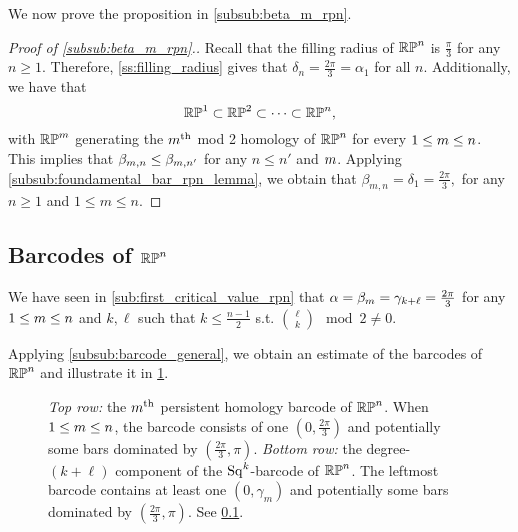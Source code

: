 \subsubsection{}
We now prove the proposition in \cref{subsub:beta_m_rpn}.

\begin{proof}[Proof of \cref{subsub:beta_m_rpn}.]
	Recall that the filling radius of $\mathbb{RP}^n$ is $\frac{\pi}{3}$ for any $n \geq 1$.
	Therefore, \cref{ss:filling_radius} gives that $\delta_n = \tfrac{2\pi}{3} = \alpha_1$ for all $n$.
	Additionally, we have that
	\[
	\mathbb{RP}^1 \subset \mathbb{RP}^2 \subset \dots \subset \mathbb{RP}^n,
	\]
	with $\mathbb{RP}^m$ generating the $m^{\mathrm{th}}$ mod 2 homology of $\mathbb{RP}^n$ for every $1 \leq m \leq n$.
	This implies that $\beta_{m, n} \leq \beta_{m, n'}$ for any $n\leq n'$ and $m$.
	Applying \cref{subsub:foundamental_bar_rpn_lemma}, we obtain that $\beta_{m,n} = \delta_1 = \tfrac{2\pi}{3},$ for any $n\geq 1$ and $1 \leq m \leq n$.
\end{proof}

\subsection{Barcodes of $\mathbb{RP}^n$}\label{sub:barcode_rpn}


We have seen in \cref{sub:first_critical_value_rpn} that $\alpha = \beta_m = \gamma_{k+\ell} = \tfrac{2\pi}{3}$ for any $1 \leq m \leq n$ and $k, \ell$ such that $k \leq \frac{n-1}{2}$ s.t. $\binom{\ell}{k} \mod 2\neq 0$.

Applying \cref{subsub:barcode_general}, we obtain an estimate of the barcodes of $\mathbb{RP}^n$ and illustrate it in \cref{fig:sq barcodes}.

\begin{figure}
	\centering
	
	\caption{\emph{Top row:} the $m^{\mathrm{th}}$ persistent homology barcode of $\mathbb{RP}^n$.
		When $1\leq m \leq n$, the barcode consists of one $(0,\frac{2\pi}{3})$ and potentially some bars dominated by $(\frac{2\pi}{3}, \pi)$.
		\emph{Bottom row:} the degree-$(k+\ell)$ component of the $\operatorname{Sq}^k$-barcode of $\mathbb{RP}^n$.
		The leftmost barcode contains at least one $(0,\gamma_m)$ and potentially some bars dominated by $(\frac{2\pi}{3}, \pi)$.
		See \cref{sub:barcode_rpn}.
	}
	\label{fig:sq barcodes}
\end{figure}


